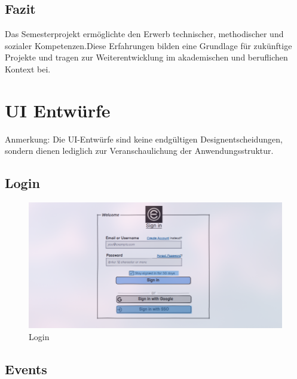 \documentclass[a4paper,12pt]{article}
\begin{document}

\subsection{Fazit}

Das Semesterprojekt ermöglichte den Erwerb technischer, methodischer und sozialer Kompetenzen.Diese Erfahrungen bilden eine Grundlage für zukünftige Projekte und tragen zur Weiterentwicklung im akademischen und beruflichen Kontext bei.

\newpage

\appendix


\section{UI Entwürfe}
Anmerkung: Die UI-Entwürfe sind keine endgültigen Designentscheidungen, sondern dienen lediglich zur Veranschaulichung der Anwendungsstruktur.

\subsection{Login}
\begin{figure}[H]
    \centering
    \includegraphics[width=1\textwidth]{Abbildungen/events/login.png}
    \caption{Login}
    \label{fig:login}
\end{figure}

\subsection{Events}
\end{document}
